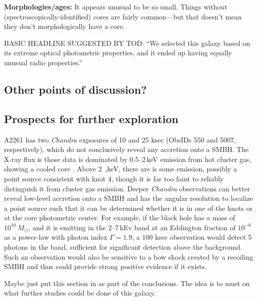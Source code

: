 \documentclass[useAMS,usenatbib]{emulateapj}
\newcommand{\msun}{M_{\odot}}
\newcommand{\fixme}[1]{{\color{red} #1 }}
\begin{document}
{\bf Morphologies/ages:} It appears unusual to be so small. Things without (spectroscopically-identified) cores are fairly common---but that doesn't mean they don't morphologically have a core. 


\fixme{BASIC HEADLINE SUGGESTED BY TOD: ``We selected this galaxy based on its extreme optical photometric properties, and it ended up having equally unusual radio properties.''}

\subsection{Other points of discussion?}

\subsection{Prospects for further exploration}
A2261 has two \emph{Chandra} exposures of 10 and 25 ksec (ObsIDs 550 and 5007, respectively), which do not conclusively reveal any accretion onto a SMBH.  The X-ray flux is those data is dominated by 0.5--2\,keV emission from hot cluster gas, showing a cooled core \citep{2005MNRAS.359.1481B}.  Above 2\
,keV, there are is some emission, possibly a point source consistent with knot 4, though it is far too faint to reliably distinguish it from cluster gas emission.  Deeper \emph{Chandra} observations can better reveal low-level accretion onto a SMBH and has the angular resolution to localize a point source such that it can be determined whether it is in one of the knots or at the core photometric center.  For example, if the black hole has a mass of $10^{10}\,\msun$, and it is emitting in the 2--7\,kEv band at an Eddington fraction of $10^{-6}$ as a power-law with photon index $\Gamma = 1.9$, a 100 ksec observation would detect 5 photons in the band, sufficient for significant detection above the background.  Such an observation would also be sensitive to a bow shock created by a recoiling SMBH and thus could provide strong positive evidence if it exists.

Maybe just put this section in as part of the conclusions. The idea is to must on what further studies could be done of this galaxy.

\end{document}
